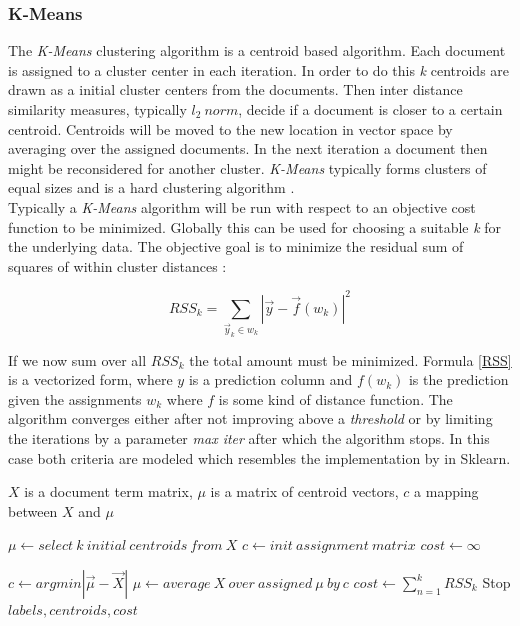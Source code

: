     \subsubsection{K-Means}
    \label{sec:k_means}

    The \emph{K-Means} clustering algorithm is a centroid based algorithm. Each document is assigned to a cluster center in each iteration. In order to do this \emph{k} centroids are drawn as a initial cluster centers from the documents. Then inter distance similarity measures, typically $l_2\:norm$, decide if a document is closer to a certain centroid. Centroids will be moved to the new location in vector space by averaging over the assigned documents. In the next iteration a document then might be reconsidered for another cluster. \emph{K-Means} typically forms clusters of equal sizes and is a hard clustering algorithm \cite{IRBookStanford2008}.\\
    Typically a \emph{K-Means} algorithm will be run with respect to an objective cost function to be minimized. Globally this can be used for choosing a suitable \emph{k} for the underlying data. The objective goal is to minimize the residual sum of squares of within cluster distances \cite{IRBookStanford2008}:

      \begin{equation}
        RSS_k = \sum_{\vec{y}_k \in \textit{w}_k}|\vec{y} - \vec{f}(\textit{w}_k)|^{2}
        \label{RSS}
      \end{equation}

    If we now sum over all $RSS_k$ the total amount must be minimized. Formula \ref{RSS} is a vectorized form, where $y$ is a prediction column and $f(w_k)$ is the prediction given the assignments $w_k$ where $f$ is some kind of distance function. The algorithm converges either after not improving above a \emph{threshold} or by limiting the iterations by a parameter \emph{max iter} after which the algorithm stops. In this case both criteria are modeled which resembles the implementation by \cite{ScikitLearn} in Sklearn.

    \begin{algorithm}[H]
    \begin{algorithmic}[1]
      \caption{$X$ is a document term matrix, $\mu$ is a matrix of centroid vectors, $c$ a mapping between $X$ and $\mu$}\label{kmeans}
        \State $\mu \gets select\:k\:initial\:centroids\:from\:X$
        \State $c \gets init\:assignment\:matrix {}$
        \State $cost \gets \infty$

          \State $c \gets argmin|\vec{\mu} - \vec{X}|$ 
          \State $\mu \gets average\:X\:over\:assigned\:\mu\:by\:c$
          \State $cost \gets \sum_{n = 1}^{k}RSS_k$
            \State Stop
          \EndIf
        \EndFor
        \State \Return $labels, centroids, cost$
      \EndFunction
    \end{algorithmic}
    \end{algorithm}

